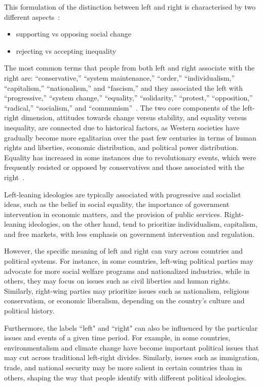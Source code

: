 This formulation of the distinction between left and right is characterised by
two different aspects~\citep{jost2018political}:
\begin{itemize}
    \item supporting vs opposing social change
    \item rejecting vs accepting inequality
\end{itemize}
The most common terms that people from both left and right associate with the right are: “conservative,” “system maintenance,” “order,” “individualism,” “capitalism,” “nationalism,” and “fascism,” and they associated the left with “progressive,” “system change,” “equality,” “solidarity,” “protest,” “opposition,” “radical,” “socialism,” and “communism”~\citep[p.~213-14]{fuchs1990}.
The two core components of the left-right dimension, attitudes towards change versus stability, and equality versus inequality, are connected due to historical factors, as Western societies have gradually become more egalitarian over the past few centuries in terms of human rights and liberties, economic distribution, and political power distribution.
Equality has increased in some instances due to revolutionary events, which were frequently resisted or opposed by conservatives and those associated with the right~\citep{nosek2009politics,burke1790reflections}.



Left-leaning ideologies are typically associated with progressive and socialist ideas, such as the belief in social equality, the importance of government intervention in economic matters, and the provision of public services.
Right-leaning ideologies, on the other hand, tend to prioritize individualism, capitalism, and free markets, with less emphasis on government intervention and regulation.

However, the specific meaning of left and right can vary across countries and political systems.
For instance, in some countries, left-wing political parties may advocate for more social welfare programs and nationalized industries, while in others, they may focus on issues such as civil liberties and human rights.
Similarly, right-wing parties may prioritize issues such as nationalism, religious conservatism, or economic liberalism, depending on the country's culture and political history.

Furthermore, the labels ``left" and ``right" can also be influenced by the particular issues and events of a given time period.
For example, in some countries, environmentalism and climate change have become important political issues that may cut across traditional left-right divides.
Similarly, issues such as immigration, trade, and national security may be more salient in certain countries than in others, shaping the way that people identify with different political ideologies.




